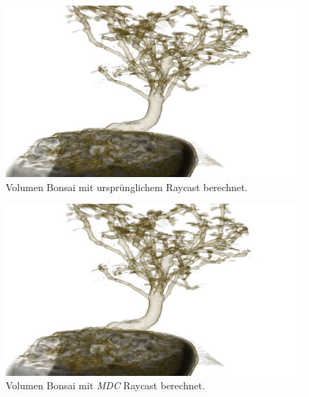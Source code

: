 \begin{landscape}
	\begin{figure}
		\centering
		\includegraphics[width=\textheight]{../../Grafiken/results/picture_quality/bonsai/Standard_img-1_Ray-1-5.png}
		\caption{Volumen Bonsai mit ursprünglichem Raycast berechnet.}
		\label{fig::res::bon_st}
	\end{figure}
\end{landscape}

\begin{landscape}
	\begin{figure}
		\centering
		\includegraphics[width=1\textheight]{../../Grafiken/results/picture_quality/bonsai/MDC_img-0-96_ray-1-5.png}
		\caption{Volumen Bonsai mit \emph{MDC} Raycast berechnet.}
		\label{fig::res::bon_mdc}
	\end{figure}
\end{landscape}

